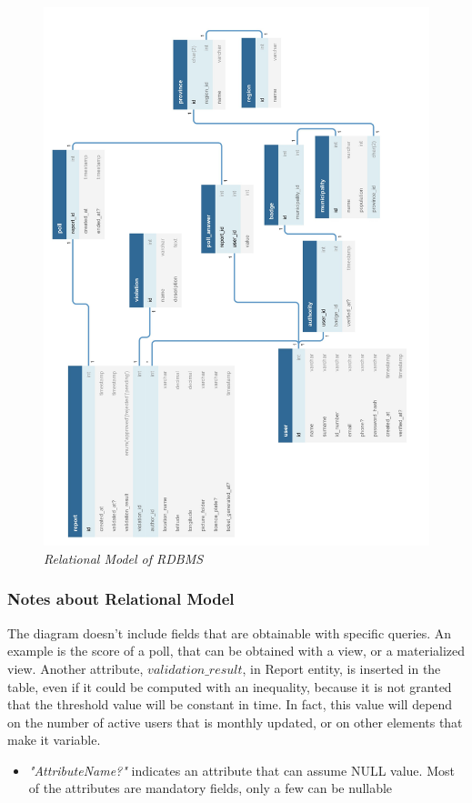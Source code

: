 \begin{figure}[H]
  \centering
  \includegraphics[origin=c,width=\textwidth]{DD_Images/RelationalModel/RelationalModel.jpg}
  \caption{\textit{Relational Model of RDBMS}}
\end{figure}

\subsubsection{Notes about Relational Model}
The diagram doesn't include fields that are obtainable with specific queries. An example is the score of a poll, that can be obtained 
with a view, or a materialized view. Another attribute, $validation\_result$, in Report entity, is 
inserted in the table, even if it could be computed with an inequality, because it is not granted that the threshold value will be constant 
in time. In fact, this value will depend on the number of active users that is monthly updated, or on other elements that make it 
variable.
\begin{itemize}
  \item \textit{"AttributeName?"} indicates an attribute that can assume NULL value. Most of the attributes are mandatory fields, only a few 
  can be nullable 
\end{itemize}


